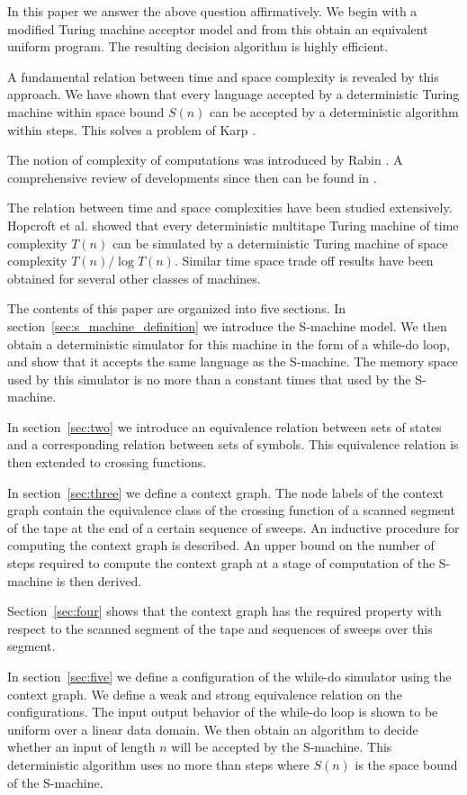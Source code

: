 In this paper we answer the above question affirmatively.
We begin with a modified Turing machine acceptor model and from this obtain an equivalent uniform program.
The resulting decision algorithm is highly efficient.

A fundamental relation between time and space complexity is revealed by this approach.
We have shown that every language accepted by a deterministic Turing machine
within space bound $S(n)$ can be accepted by a deterministic algorithm
within  steps.
This solves a problem of Karp \cite{}.

The notion of complexity of computations was introduced by Rabin \cite{}.
A comprehensive review of developments since then can be found in \cite{}.

The relation between time and space complexities have been studied extensively.
Hopcroft et al. \cite{} showed that every deterministic multitape Turing machine of time complexity
$T(n)$ can be simulated by a deterministic Turing machine of space complexity $T(n)/\log T(n)$.
Similar time space trade off results have been obtained for several other classes
of machines. \cite{}

The contents of this paper are organized into five sections.
In section~\ref{sec:s_machine_definition} we introduce the S-machine model.
We then obtain a deterministic simulator for this machine in the form of a
while-do loop, and show that it accepts the same language as the S-machine.
The memory space used by this simulator is no more than a constant times that used by the S-machine.

In section~\ref{sec:two} we introduce an equivalence relation between sets of states and a
corresponding relation between sets of symbols.
This equivalence relation is then extended to crossing functions.

In section~\ref{sec:three} we define a context graph.
The node labels of the context graph contain the equivalence class of the crossing
function of a scanned segment of the tape at the end of a certain sequence of sweeps.
An inductive procedure for computing the context graph is described.
An upper bound on the number of steps required to compute the context graph at a
stage of computation of the S-machine is then derived.

Section~\ref{sec:four} shows that the context graph has the required property with
respect to the scanned segment of the tape and sequences of sweeps over this segment.

In section~\ref{sec:five} we define a configuration of the while-do simulator using the context graph.
We define a weak and strong equivalence relation on the configurations.
The input output behavior of the while-do loop is shown to be uniform over a linear data domain.
We then obtain an algorithm to decide whether an input of length $n$ will be accepted by the S-machine.
This deterministic algorithm uses no more than  steps where $S(n)$ is the space bound of the S-machine.

